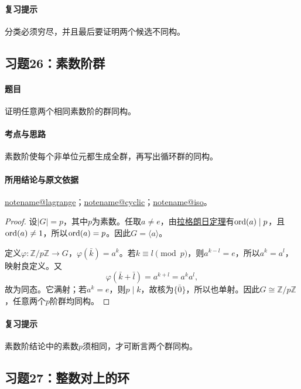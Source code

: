 \documentclass[UTF8,a4paper,11pt,fontset=windows]{ctexart}
\makeatletter
\newcommand{\Z}{\mathbb Z}\newcommand{\Q}{\mathbb Q}
\newcommand{\noteref}[1]{\hyperref[note:#1]{\csname notename@#1\endcsname}}
\newcommand{\proofref}[2]{\hyperref[note:#1]{#2}}
\newcommand{\exref}[2]{\hyperref[ex:#1:#2]{第#1章习题#2}}
\makeatother
\begin{document}
\paragraph{复习提示}
分类必须穷尽，并且最后要证明两个候选不同构。


\subsection{习题26：\texorpdfstring{素数阶群}{素数阶群}}
\label{ex:1:26}

\paragraph{题目}
证明任意两个相同素数阶的群同构。

\paragraph{考点与思路}
素数阶使每个非单位元都生成全群，再写出循环群的同构。

\paragraph{所用结论与原文依据}
\noteref{lagrange}；\noteref{cyclic}；\noteref{iso}。


\begin{proof}
设$|G|=p$，其中$p$为素数。任取$a\ne e$，由\proofref{lagrange}{拉格朗日定理}有$\operatorname{ord}(a)\mid p$，且$\operatorname{ord}(a)\ne1$，所以$\operatorname{ord}(a)=p$。因此$G=\langle a\rangle$。

定义$\varphi:\Z/p\Z\to G$，$\varphi(\bar k)=a^k$。若$k\equiv l\pmod p$，则$a^{k-l}=e$，所以$a^k=a^l$，映射良定义。又
\[
\varphi(\bar k+\bar l)=a^{k+l}=a^ka^l,
\]
故为同态。它满射；若$a^k=e$，则$p\mid k$，故核为$\{\bar0\}$，所以也单射。因此$G\cong\Z/p\Z$，任意两个$p$阶群均同构。
\end{proof}

\paragraph{复习提示}
素数阶结论中的素数$p$须相同，才可断言两个群同构。


\subsection{习题27：\texorpdfstring{整数对上的环}{整数对上的环}}
\label{ex:1:27}
\end{document}
